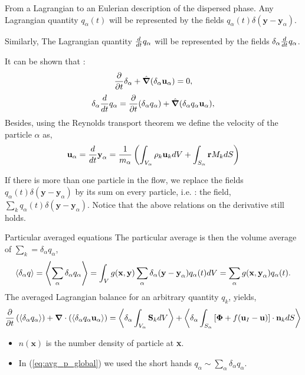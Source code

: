 \documentclass{sintefbeamer}
\newcommand{\nablab}{\bm{\nabla}}
\newcommand{\nablabh}{\hat{\bm{\nabla}}}
\begin{document}
\begin{frame}{From a Lagrangian to an Eulerian description of the dispersed phase.}
  Any Lagrangian quantity $q_\alpha(t)$ will be represented by the fields $q_\alpha(t)\delta(\textbf{y}-\textbf{y}_\alpha)$.

  Similarly, The Lagrangian quantity $\frac{d}{d t} q_\alpha$ will be represented by the fields $\delta_\alpha \frac{d}{d t} q_\alpha$.

  It can be shown that : 
  \begin{equation*}
    \pddt \delta_\alpha
    + \nablabh (\delta_\alpha \textbf{u}_\alpha)
    = 0,
    \label{eq:delta_q_alpha_dt}
\end{equation*}
\begin{equation*}
    \delta_\alpha \ddt q_\alpha
    = \pddt (\delta_\alpha q_\alpha)
    + \nablabh (\delta_\alpha q_\alpha \textbf{u}_\alpha),
    \label{eq:delta_q_alpha_dt}
\end{equation*}
Besides, using the Reynolds transport theorem we define the velocity of the particle $\alpha$ as,  
\begin{equation*}
  \textbf{u}_\alpha
  = \frac{d}{d t} \textbf{y}_\alpha
  = \frac{1}{m_\alpha} \left(
      \int_{V_\alpha} \rho_k \textbf{u}_k dV
      +  \int_{S_\alpha} \textbf{r} M_k dS
  \right)
\end{equation*}

If there is more than one particle in the flow, we replace the fields $q_\alpha(t)\delta(\textbf{y}-\textbf{y}_\alpha)$ by its sum on every particle, i.e. : the field, $\sum_k q_\alpha(t)\delta(\textbf{y}-\textbf{y}_\alpha)$.
Notice that the above relations on the derivative still holds.
\end{frame}


\begin{frame}{Particular averaged equations}  
  The particular average is then the volume average of $\sum_k = \delta_\alpha q_\alpha$,
  \begin{equation*}
    \left<\delta_\alpha q\right>
    = \left<\sum_\alpha \delta_\alpha q_\alpha\right> 
    = \int_V g(\textbf{x},\textbf{y}) \sum_\alpha \delta_\alpha(\textbf{y}- \textbf{y}_\alpha) q_\alpha(t) dV 
    =  \sum_\alpha g(\textbf{x},\textbf{y}_\alpha) q_\alpha(t).
\end{equation*}
The averaged Lagrangian balance for an arbitrary quantity $q_k$, yields, 
\begin{equation}
  \pddt   \left(\pavg{q_\alpha}\right)
  + \nablab \cdot \left(\pavg{q_\alpha \textbf{u}_\alpha}\right) 
  = \pavg{\int_{V_\alpha} \textbf{S}_k dV}
  + \pavg{\int_{S_\alpha} \left[\bm{\Phi} + f (\textbf{u}_I-\textbf{u}) \right] \cdot \textbf{n}_k d S}
  \label{eq:avg_p_global}
\end{equation}
\begin{itemize}
  \item $n(\textbf{x})$ is the number density of particle at \textbf{x}.  
  \item In (\ref{eq:avg_p_global}) we used the short hands $q_\alpha \sim \sum_\alpha \delta_\alpha q_\alpha$.
\end{itemize}
\end{frame}
\end{document}

